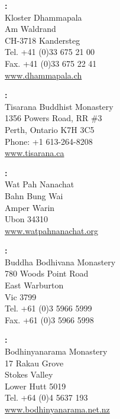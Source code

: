 {\begin{minipage}{0.8\linewidth}
\begin{multicols}{2}
{\vfill

\textbf{\MakeUppercase{\textSwitzerland}:} \\
Kloster Dhammapala\\
Am Waldrand\\
CH-3718 Kandersteg\\
Tel. +41 (0)33 675 21 00\\
Fax. +41 (0)33 675 22 41\\
\href{http://www.dhammapala.ch}{www.dhammapala.ch}

\vfill

\textbf{\MakeUppercase{\textCanada}:} \\
Tisarana Buddhist Monastery\\
1356 Powers Road, RR \#3\\
Perth, Ontario K7H 3C5\\
Phone: +1 613-264-8208\\
\href{http://www.tisarana.ca}{www.tisarana.ca}

}

\columnbreak

{\raggedright

\textbf{\MakeUppercase{\textThailand}:} \\
Wat Pah Nanachat\\
Bahn Bung Wai\\
Amper Warin\\
Ubon 34310\\
\href{http://www.watpahnanachat.org}{www.watpahnanachat.org}

\vfill

\textbf{\MakeUppercase{\textAustralia}:} \\
Buddha Bodhivana Monastery\\
780 Woods Point Road\\
East Warburton\\
Vic 3799\\
Tel. +61 (0)3 5966 5999\\
Fax. +61 (0)3 5966 5998

\vfill

\textbf{\MakeUppercase{\textNewZealand}:} \\
Bodhinyanarama Monastery\\
17 Rakau Grove\\
Stokes Valley\\
Lower Hutt 5019\\
Tel. +64 (0)4 5637 193\\
\href{http://www.bodhinyanarama.net.nz}{www.bodhinyanarama.net.nz}

}
\end{multicols}
\end{minipage}}

